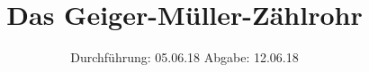 

\subject{V703}
\title{Das Geiger-Müller-Zählrohr}
\date{
  Durchführung: 05.06.18
  \hspace{3em}
  Abgabe: 12.06.18
}



\maketitle
\thispagestyle{empty}
\tableofcontents
\newpage








\newpage
\printbibliography


